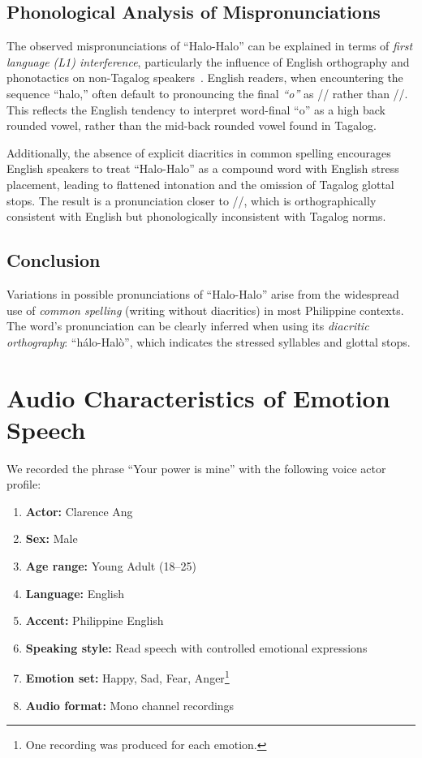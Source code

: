 \documentclass{article}
\begin{document}
\subsection{Phonological Analysis of Mispronunciations}

The observed mispronunciations of ``Halo-Halo'' can be explained in terms of
\emph{first language (L1) interference}, particularly the influence of English
orthography and phonotactics on non-Tagalog
speakers~\cite{hansenedwards2008phonology}. English readers, when encountering
the sequence ``halo,'' often default to pronouncing the final \emph{``o''} as
// rather than //. This reflects the English tendency to
interpret word-final ``o'' as a high back rounded vowel, rather than the
mid-back rounded vowel found in Tagalog.

Additionally, the absence of explicit diacritics in common spelling encourages
English speakers to treat ``Halo-Halo'' as a compound word with English stress
placement, leading to flattened intonation and the omission of Tagalog glottal
stops. The result is a pronunciation closer to //, which is
orthographically consistent with English but phonologically inconsistent with
Tagalog norms.

\subsection{Conclusion}

Variations in possible pronunciations of ``Halo-Halo'' arise from the
widespread use of \emph{common spelling} (writing without diacritics) in most
Philippine contexts. The word's pronunciation can be clearly inferred when
using its \emph{diacritic orthography}: ``h\'alo-Hal\`o'', which indicates the
stressed syllables and glottal stops.

\section{Audio Characteristics of Emotion Speech}

We recorded the phrase ``Your power is mine'' with the following voice actor
profile:

\begin{enumerate}
	\item \textbf{Actor:} Clarence Ang
	\item \textbf{Sex:} Male
	\item \textbf{Age range:} Young Adult (18--25)
	\item \textbf{Language:} English
	\item \textbf{Accent:} Philippine English
	\item \textbf{Speaking style:} Read speech with controlled emotional expressions
	\item \textbf{Emotion set:} Happy, Sad, Fear, Anger\footnote{One recording was produced for each emotion.}
	\item \textbf{Audio format:} Mono channel recordings
\end{enumerate}
\end{document}
